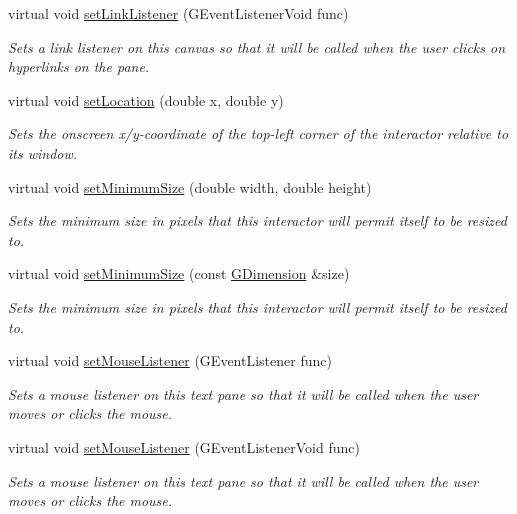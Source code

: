 \begin{DoxyCompactItemize}
virtual void \mbox{\hyperlink{classGBrowserPane_aca745635b2c4ceb74587ca5cfc26f0c3}{set\+Link\+Listener}} (G\+Event\+Listener\+Void func)
\begin{DoxyCompactList}\small\item\em Sets a link listener on this canvas so that it will be called when the user clicks on hyperlinks on the pane. \end{DoxyCompactList}\item 
virtual void \mbox{\hyperlink{classGInteractor_a04594e8ba9b98513a64f1da00dcae18c}{set\+Location}} (double x, double y)
\begin{DoxyCompactList}\small\item\em Sets the onscreen x/y-\/coordinate of the top-\/left corner of the interactor relative to its window. \end{DoxyCompactList}\item 
virtual void \mbox{\hyperlink{classGInteractor_a0cf428e207b7f22cc08138a90b1b87b2}{set\+Minimum\+Size}} (double width, double height)
\begin{DoxyCompactList}\small\item\em Sets the minimum size in pixels that this interactor will permit itself to be resized to. \end{DoxyCompactList}\item 
virtual void \mbox{\hyperlink{classGInteractor_a3b1046117ac6cb7abe467e00ba8a81f4}{set\+Minimum\+Size}} (const \mbox{\hyperlink{classGDimension}{G\+Dimension}} \&size)
\begin{DoxyCompactList}\small\item\em Sets the minimum size in pixels that this interactor will permit itself to be resized to. \end{DoxyCompactList}\item 
virtual void \mbox{\hyperlink{classGBrowserPane_a37d8dbc943f59920f705b0104f60bde2}{set\+Mouse\+Listener}} (G\+Event\+Listener func)
\begin{DoxyCompactList}\small\item\em Sets a mouse listener on this text pane so that it will be called when the user moves or clicks the mouse. \end{DoxyCompactList}\item 
virtual void \mbox{\hyperlink{classGBrowserPane_aea7f647ea62d59f71b5fad6aa65eeaf9}{set\+Mouse\+Listener}} (G\+Event\+Listener\+Void func)
\begin{DoxyCompactList}\small\item\em Sets a mouse listener on this text pane so that it will be called when the user moves or clicks the mouse. \end{DoxyCompactList}\item 

\end{DoxyCompactItemize}
